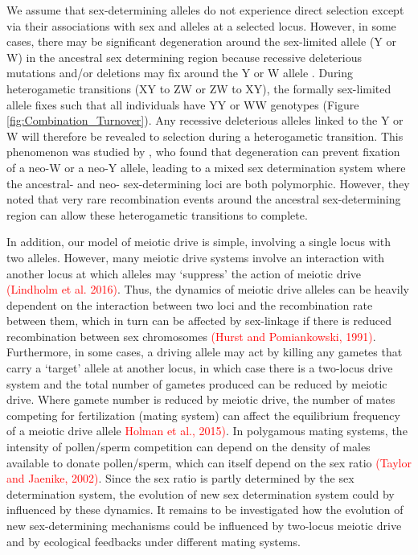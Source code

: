 \documentclass[12pt]{article}
\begin{document}
We assume that sex-determining alleles do not experience direct selection except via their associations with sex and alleles at a selected locus. 
However, in some cases, there may be significant degeneration around the sex-limited allele (Y or W) in the ancestral sex determining region because recessive deleterious mutations and/or deletions may fix around the Y or W allele \citep{Rice:1996ke,Charlesworth:2000cc,Bachtrog:2006ed,Marais:2008hm}. 
During heterogametic transitions (XY to ZW or ZW to XY), the formally sex-limited allele fixes such that all individuals have YY or WW genotypes (Figure \ref{fig:Combination_Turnover}). 
Any recessive deleterious alleles linked to the Y or W will therefore be revealed to selection during a heterogametic transition. 
This phenomenon was studied by \citet{vanDoorn:2010hu}, who found that degeneration can prevent fixation of a neo-W or a neo-Y allele, leading to a mixed sex determination system where the ancestral- and neo- sex-determining loci are both polymorphic. 
However, they noted that very rare recombination events around the ancestral sex-determining region can allow these heterogametic transitions to complete.  

In addition, our model of meiotic drive is simple, involving a single locus with two alleles. 
However, many meiotic drive systems involve an interaction with another locus at which alleles may `suppress' the action of meiotic drive \citep{Burt:2006} \textcolor{red}{(Lindholm et al. 2016)}. 
Thus, the dynamics of meiotic drive alleles can be heavily dependent on the interaction between two loci and the recombination rate between them, which in turn can be affected by sex-linkage if there is reduced recombination between sex chromosomes \textcolor{red}{(Hurst and Pomiankowski, 1991)}. 
Furthermore, in some cases, a driving allele may act by killing any gametes that carry a `target' allele at another locus, in which case there is a two-locus drive system and the total number of gametes produced can be reduced by meiotic drive. 
Where gamete number is reduced by meiotic drive, the number of mates competing for fertilization (mating system) can affect the equilibrium frequency of a meiotic drive allele \textcolor{red}{Holman et al., 2015)}. 
In polygamous mating systems, the intensity of pollen/sperm competition can depend on the density of males available to donate pollen/sperm, which can itself depend on the sex ratio \textcolor{red}{(Taylor and Jaenike, 2002)}. 
Since the sex ratio is partly determined by the sex determination system, the evolution of new sex determination system could by influenced by these dynamics. 
It remains to be investigated how the evolution of new sex-determining mechanisms could be influenced by two-locus meiotic drive and by ecological feedbacks under different mating systems.
\end{document}
